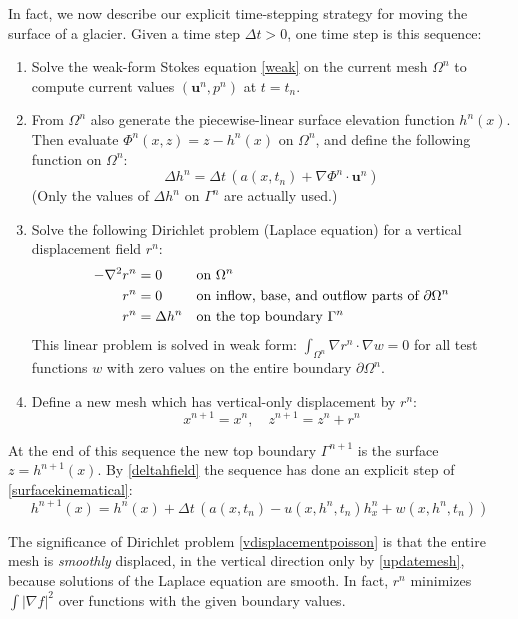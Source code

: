\documentclass[letterpaper,final,12pt,reqno]{amsart}
\newcommand{\grad}{\nabla}
\newcommand{\bu}{\mathbf{u}}
\begin{document}
In fact, we now describe our explicit time-stepping strategy for moving the surface of a glacier.  Given a time step $\Delta t > 0$, one time step is this sequence:

\medskip
\renewcommand{\labelenumi}{\emph{\arabic{enumi}.}}
\begin{enumerate}
\item Solve the weak-form Stokes equation \eqref{weak} on the current mesh $\Omega^n$ to compute current values $(\bu^n,p^n)$ at $t=t_n$.
\item From $\Omega^n$ also generate the piecewise-linear surface elevation function $h^n(x)$.  Then evaluate $\Phi^n(x,z) = z - h^n(x)$ on $\Omega^n$, and define the following function on $\Omega^n$:
\begin{equation}
\Delta h^n =  \Delta t\,\left(a(x,t_n) + \grad \Phi^n\cdot \bu^n\right) \label{deltahfield}
\end{equation}
(Only the values of $\Delta h^n$ on $\Gamma^n$ are actually used.)
\item Solve the following Dirichlet problem (Laplace equation) for a vertical displacement field $r^n$:
\begin{align}
- \grad^2 r^n &= 0 & &\text{on } \Omega^n \label{vdisplacementpoisson} \\
          r^n &= 0 & &\text{on inflow, base, and outflow parts of } \partial \Omega^n \notag \\
          r^n &= \Delta h^n & &\text{on the top boundary } \Gamma^n \notag
\end{align}
This linear problem is solved in weak form: $\int_{\Omega^n} \grad r^n\cdot \grad w = 0$ for all test functions $w$ with zero values on the entire boundary $\partial \Omega^n$.
\item Define a new mesh which has vertical-only displacement by $r^n$:
\begin{equation}
  x^{n+1} = x^n, \quad z^{n+1} = z^n + r^n \label{updatemesh}
\end{equation}
\end{enumerate}

\medskip
At the end of this sequence the new top boundary $\Gamma^{n+1}$ is the surface $z=h^{n+1}(x)$.  By \eqref{deltahfield} the sequence has done an explicit step of \eqref{surfacekinematical}:
    $$h^{n+1}(x) = h^n(x) + \Delta t\,\left(a(x,t_n) - u(x,h^n,t_n) h_x^n + w(x,h^n,t_n)\right)$$

The significance of Dirichlet problem \eqref{vdisplacementpoisson} is that the entire mesh is \emph{smoothly} displaced, in the vertical direction only by \eqref{updatemesh}, because solutions of the Laplace equation are smooth.  In fact, $r^n$ minimizes $\int |\grad f|^2$ over functions with the given boundary values.
\end{document}
